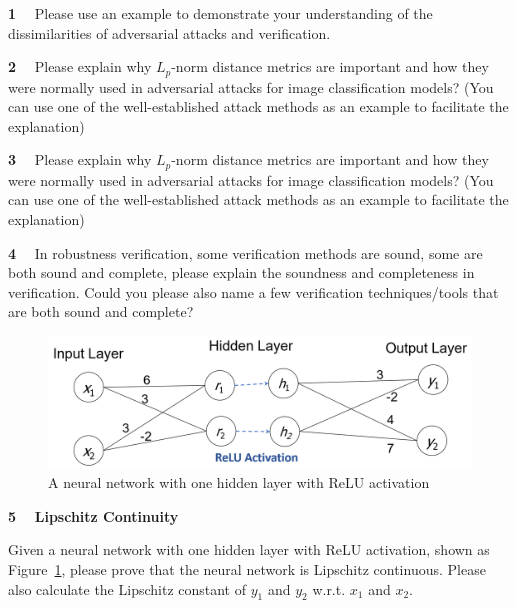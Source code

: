 \newpage 
{}


\begin{newquestion}{\textbf{1}~~}
Please use an example to demonstrate your understanding of the dissimilarities of adversarial attacks and verification.
\end{newquestion}


\begin{newquestion}{\textbf{2}~~}
Please explain why $L_p$-norm distance metrics are important and how they were normally used in adversarial attacks for image classification models? (You can use one of the well-established attack methods as an example to facilitate the explanation)
\end{newquestion}


\begin{newquestion}{\textbf{3}~~}
Please explain why $L_p$-norm distance metrics are important and how they were normally used in adversarial attacks for image classification models? (You can use one of the well-established attack methods as an example to facilitate the explanation)
\end{newquestion}


\begin{newquestion}{\textbf{4}~~}
In robustness verification, some verification methods are sound, some are both sound and complete, please explain the soundness and completeness in verification. Could you please also name a few verification techniques/tools that are both sound and complete?
\end{newquestion}


\begin{figure}[h]
	\centering
	\includegraphics[width=0.8\linewidth]{images/robustnessVerification/q5.PNG}
	\caption{A neural network with one hidden layer with ReLU activation}
	\label{fig-q5}
\end{figure}

\begin{newquestion}{\textbf{5}~~}
\textbf{Lipschitz Continuity}

Given a neural network with one hidden layer with ReLU activation, shown as Figure~\ref{fig-q5}, please prove that the neural network is Lipschitz continuous. Please also calculate the Lipschitz constant of $y_1$ and $y_2$ w.r.t. $x_1$ and $x_2$.

\end{newquestion}



